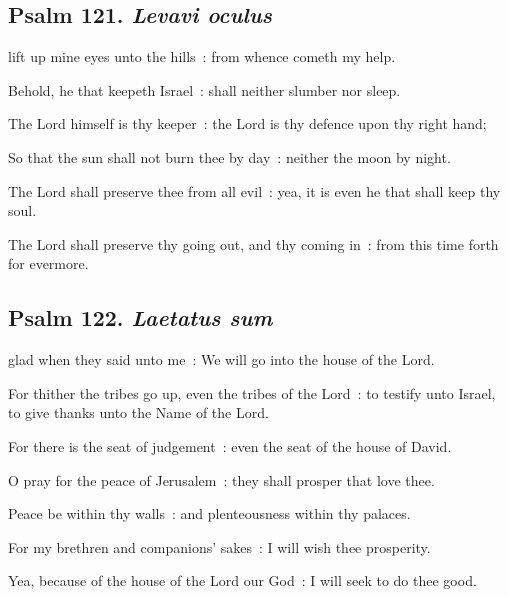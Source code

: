 \subsection{Psalm 121. \textit{Levavi oculus}}

 lift up mine eyes unto the hills~: from whence cometh my help.\par
{}
Behold, he that keepeth Israel~: shall neither slumber nor sleep.\par
{}The Lord himself is thy keeper~: the Lord is thy defence upon thy right hand;\par
{}So that the sun shall not burn thee by day~: neither the moon by night.\par
{}The Lord shall preserve thee from all evil~: yea, it is even he that shall keep thy soul.\par
{}The Lord shall preserve thy going out, and thy coming in~: from this time forth for evermore.\par

\subsection{Psalm 122. \textit{Laetatus sum}}

 glad when they said unto me~: We will go into the house of the Lord.\par
{}
For thither the tribes go up, even the tribes of the Lord~: to testify unto Israel, to give thanks unto the Name of the Lord.\par
{}For there is the seat of judgement~: even the seat of the house of David.\par
{}O pray for the peace of Jerusalem~: they shall prosper that love thee.\par
{}Peace be within thy walls~: and plenteousness within thy palaces.\par
{}For my brethren and companions' sakes~: I will wish thee prosperity.\par
{}Yea, because of the house of the Lord our God~: I will seek to do thee good.\par

